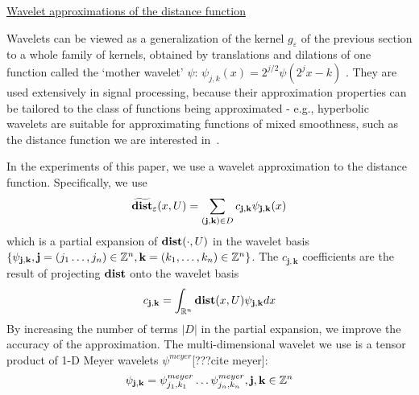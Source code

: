 \underline{Wavelet approximations of the distance function}

Wavelets can be viewed as a generalization of the kernel $g_\varepsilon$ of the previous section to a whole family of kernels, obtained by translations and dilations of one function called the `mother wavelet' $\psi$: $\psi_{j,k}(x) = 2^{j/2}\psi(2^jx - k)$  \cite{MallatBook}.
They are used extensively in signal processing, because their approximation properties can be tailored to the class of functions being approximated - e.g., hyperbolic wavelets are suitable for approximating functions of mixed smoothness, such as the distance function we are interested in~\cite{Heping04_HyperbolicWav}.

In the experiments of this paper, we use a wavelet approximation to the distance function.
Specifically, we use
\[\widetilde{\mathbf{dist}}_\varepsilon(x,U) =  \sum_{\mathbf{(j,k)} \in D}c_{\mathbf{j,k}}\psi_{\mathbf{j,k}}(x)\]
which is a partial expansion of $\mathbf{dist}(\cdot,U)$ in the wavelet basis $\{\psi_{\mathbf{j,k}}, \mathbf{j} = (j_1\ldots,j_n) \in \mathbb{Z}^n, \mathbf{k} = (k_1,\ldots,k_n) \in \mathbb{Z}^n\}$.
The $c_{\mathbf{j,k}}$ coefficients are the result of projecting $\mathbf{dist}$ onto the wavelet basis
\[ c_{\mathbf{j,k}} = \int_{\mathbb{R}^n}\mathbf{dist}(x,U)\psi_{\mathbf{j,k}}dx\]
By increasing the number of terms $|D|$ in the partial expansion, we improve the accuracy of the approximation.
The multi-dimensional wavelet we use is a tensor product of 1-D Meyer wavelets $\psi^{meyer}$[???cite meyer]:
\begin{equation}
\label{eq:multid meyer}
\psi_{\mathbf{j,k}} = \psi_{j_1,k_1}^{meyer}\ldots \psi_{j_n,k_n}^{meyer}, \mathbf{j,k} \in \mathbb{Z}^n
\end{equation}

 
